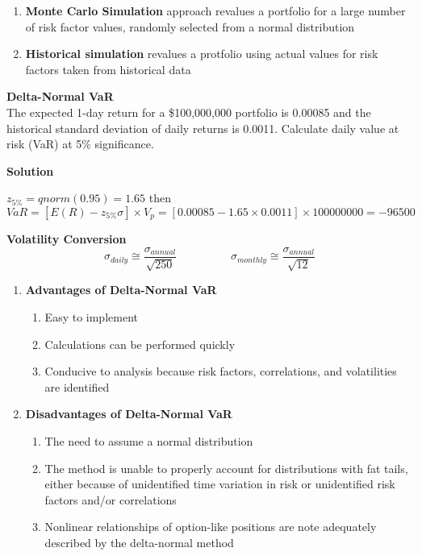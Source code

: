 \documentclass[11pt,fleqn]{book} %
\numberwithin{equation}{section} %
\numberwithin{figure}{section} %
\numberwithin{table}{section} %
\begin{document}
\begin{definition}
\begin{enumerate}
    \item \textbf{Monte Carlo Simulation} approach revalues a portfolio for a large number of risk factor values, randomly selected from a normal distribution
    \item \textbf{Historical simulation} revalues a protfolio using actual values for risk factors taken from historical data
\end{enumerate}
\end{definition}
\begin{exercise}\textbf{Delta-Normal VaR}\\
The expected 1-day return for a \$100,000,000 portfolio is 0.00085 and the historical standard deviation of daily returns is 0.0011. Calculate daily value at risk (VaR) at 5\% significance.

\textbf{Solution}

$z_{5\%}=qnorm(0.95)=1.65$ then
$$
VaR=[E(R)-z_{5\%}\sigma]\times V_p=[0.00085-1.65\times 0.0011]\times 100000000=-96500
$$
\end{exercise}
\begin{remark}\textbf{Volatility Conversion}
$$
\sigma_{daily}\cong\frac{\sigma_{annual}}{\sqrt{250}}\hspace{2cm}\sigma_{monthly}\cong\frac{\sigma_{annual}}{\sqrt{12}}
$$
\end{remark}
\begin{remark}
\begin{enumerate}
    \item \textbf{Advantages of Delta-Normal VaR}
    \begin{enumerate}
        \item Easy to implement
        \item Calculations can be performed quickly
        \item Conducive to analysis because risk factors, correlations, and volatilities are identified
    \end{enumerate}
    \item \textbf{Disadvantages of Delta-Normal VaR}
    \begin{enumerate}
        \item The need to assume a normal distribution
        \item The method is unable to properly account for distributions with fat tails, either because of unidentified time variation in risk or unidentified risk factors and/or correlations
        \item Nonlinear relationships of option-like positions are note adequately described by the delta-normal method
    \end{enumerate}
\end{enumerate}
\end{remark}
\end{document}
